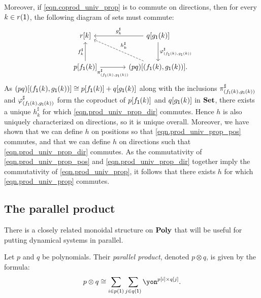 \documentclass[Book-Poly]{subfiles}
\begin{document}
\begin{exercise}
\begin{solution}
Moreover, if \eqref{eqn.coprod_univ_prop} is to commute on directions, then for every $k \in r(\textsf{1})$, the following diagram of sets must commute:
\begin{equation} \label{eqn.prod_univ_prop_dir}
\begin{tikzcd}[sep=large]
	r[k] & q[g_\1(k)] \ar[l, "g^\sharp_k"'] \ar[d, "\varphi^\sharp_{(f_\1(k), g_\1(k))}"] \\
	p[f_\1(k)] \ar[u, "f^\sharp_k"] \ar[r, "\pi^\sharp_{(f_\1(k), g_\1(k))}"'] & (pq)[(f_\1(k), g_\1(k))]. \ar[ul, "h^\sharp_k"', dashed]
\end{tikzcd}
\end{equation}
As $(pq)[(f_{\textsf{1}}(k), g_{\textsf{1}}(k))] \cong p[f_{\textsf{1}}(k)] + q[g_{\textsf{1}}(k)]$ along with the inclusions $\pi^\sharp_{(f_{\textsf{1}}(k), g_{\textsf{1}}(k))}$ and $\varphi^\sharp_{(f_{\textsf{1}}(k), g_{\textsf{1}}(k))}$ form the coproduct of $p[f_{\textsf{1}}(k)]$ and $q[g_{\textsf{1}}(k)]$ in $\mathbf{Set}$, there exists a unique $h^\sharp_k$ for which \eqref{eqn.prod_univ_prop_dir} commutes.
Hence $h$ is also uniquely characterized on directions, so it is unique overall.
Moreover, we have shown that we can define $h$ on positions so that \eqref{eqn.prod_univ_prop_pos} commutes, and that we can define $h$ on directions such that \eqref{eqn.prod_univ_prop_dir} commutes.
As the commutativity of \eqref{eqn.prod_univ_prop_pos} and \eqref{eqn.prod_univ_prop_dir} together imply the commutativity of \eqref{eqn.prod_univ_prop}, it follows that there exists $h$ for which \eqref{eqn.prod_univ_prop} commutes.
\end{solution}
\end{exercise}

\subsection{The parallel product} \label{subsec.poly.cat.monoidal.par}
There is a closely related monoidal structure on $\mathbf{Poly}$ that will be useful for putting dynamical systems in parallel.

\begin{definition} \label{def.parallel}
Let $p$ and $q$ be polynomials. Their \emph{parallel product}, denoted $p\otimes q$, is given by the formula:
\begin{equation}\label{eqn.parallel_def}
p\otimes q\iso\sum_{i\in p(\1)}\sum_{j\in q(\1)}\yon^{p[i]\times q[j]}.
\end{equation}
\end{definition}
\end{document}
